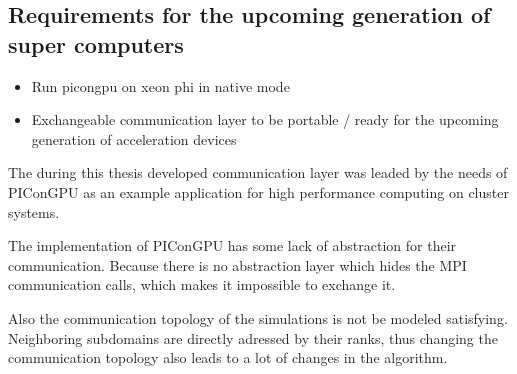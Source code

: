 
\subsection{Requirements for the upcoming generation of super computers}
\begin{itemize}
\item Run picongpu on xeon phi in native mode
\item Exchangeable communication layer to be portable / ready for the
  upcoming generation of acceleration devices
\end{itemize}


The during this thesis developed communication layer was leaded by the
needs of PIConGPU as an example application for high performance
computing on cluster systems.

The implementation of PIConGPU has some lack of abstraction for their
communication. Because there is no abstraction layer which hides the
MPI communication calls, which makes it impossible to exchange it.

Also the communication topology of the simulations is not be modeled
satisfying. Neighboring subdomains are directly adressed by their
ranks, thus changing the communication topology also leads to a lot of
changes in the algorithm.



\cleardoublepage

